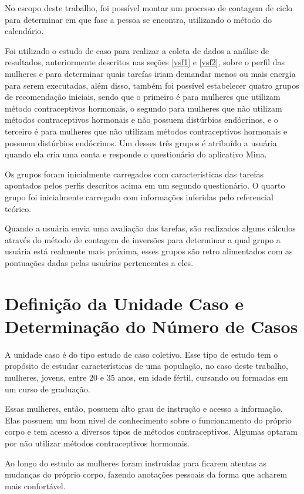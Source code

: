 No escopo deste trabalho, foi possível montar um processo de contagem de ciclo para determinar em que fase a pessoa se encontra, utilizando o 
método do calendário.

Foi utilizado o estudo de caso para realizar a coleta de dados a análise de resultados, anteriormente descritos nas seções \ref{vsf1} e \ref{vsf2}, 
sobre o perfil das mulheres e para determinar quais tarefas iriam demandar 
menos ou mais energia para serem executadas, além disso, também foi possível estabelecer quatro grupos de recomendação iniciais, sendo que o 
primeiro é para mulheres que utilizam método contraceptivos hormonais, o segundo para mulheres que não utilizam métodos contraceptivos hormonais e 
não possuem distúrbios endócrinos, e o terceiro é para mulheres que não utilizam métodos contraceptivos hormonais e possuem distúrbios endócrinos. 
Um desses três grupos é atribuído a usuária quando ela cria uma conta e responde o questionário do aplicativo Mina. 

Os grupos foram inicialmente carregados com características das tarefas apontados pelos perfis descritos acima em um segundo questionário. 
O quarto grupo foi inicialmente carregado com informações inferidas pelo referencial teórico. 

Quando a usuária envia uma avaliação das tarefas, são realizados alguns cálculos através do método de contagem de inversões para determinar 
a qual grupo a usuária está realmente mais próxima, esses grupos são retro alimentados com as pontuações dadas pelas usuárias pertencentes a eles.

\section{Definição da Unidade Caso e Determinação do Número de Casos}

A unidade caso é do tipo estudo de caso coletivo. Esse tipo de estudo tem o propósito de estudar características
de uma população, no caso deste trabalho, mulheres, jovens, entre 20 e 35 anos, em idade fértil, cursando ou 
formadas em um curso de graduação. 

Essas mulheres, então, possuem alto grau de instrução e acesso a informação. Elas possuem um bom nível de conhecimento sobre o 
funcionamento do próprio corpo e tem acesso a diversos tipos de métodos contraceptivos. Algumas optaram por não utilizar 
métodos contraceptivos hormonais. 

Ao longo do estudo as mulheres foram instruídas para ficarem atentas as mudanças do próprio corpo, fazendo anotações pessoais 
da forma que acharem mais confortável.

